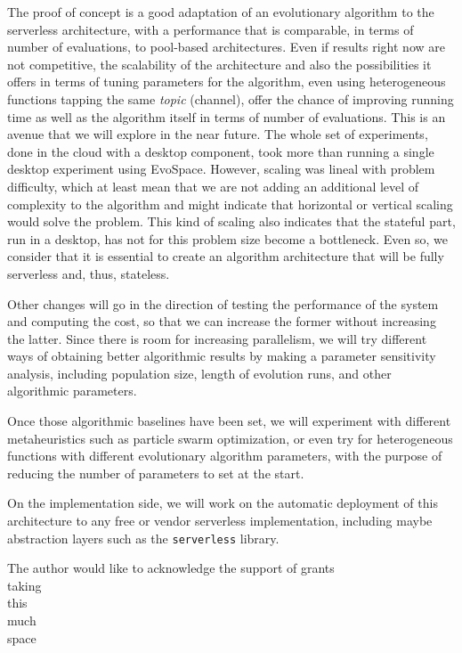 \documentclass[sigconf]{acmart}
\begin{document}
The proof of concept is a good adaptation of an evolutionary algorithm
to the serverless architecture, with a performance that is comparable,
in terms of number of evaluations, to pool-based architectures. Even
if results right now are not competitive, the scalability of the
architecture and also the possibilities it offers in terms of tuning
parameters for the algorithm, even using heterogeneous functions
tapping the same {\em topic} (channel), offer the chance of improving
running time as well as the algorithm itself in terms of number of
evaluations. This is an avenue that we will explore in the near
future. The whole set of experiments, done in the cloud with a desktop
component, took more than running a single desktop experiment using
EvoSpace. However, scaling was lineal with problem difficulty, which
at least mean that we are not adding an additional level of complexity
to the algorithm and might indicate that horizontal or vertical
scaling would solve the problem. This kind of scaling also indicates
that the stateful part, run in a desktop, has not for this problem
size become a bottleneck. Even so, we consider that it is essential to
create an algorithm architecture that will be fully serverless and,
thus, stateless.

Other changes will go in the direction of testing the performance of
the system and computing the cost, so that we can increase the former
without increasing the latter. Since there is room for increasing
parallelism, we will try different ways of obtaining better
algorithmic results by making a parameter sensitivity analysis,
including population size, length of evolution runs, and other
algorithmic parameters.

Once those algorithmic baselines have been set, we will experiment
with different metaheuristics such as particle swarm optimization, or
even try for heterogeneous functions with different evolutionary
algorithm parameters, with the purpose of reducing the number of
parameters to set at the start.

On the implementation side, we will work on the automatic deployment
of this architecture to any free or vendor serverless implementation,
including maybe abstraction layers such as the {\tt serverless}
library.




\begin{acks}

  The author would like to acknowledge the support of grants\\
  taking\\
  this\\
  much\\
  space\\

\end{acks}




\end{document}
